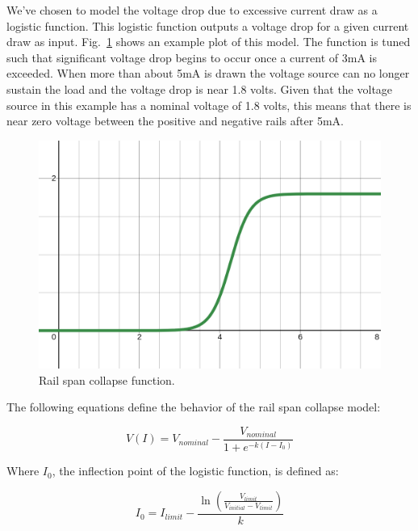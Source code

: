 \documentclass[conference]{IEEEtran}
\begin{document}
    We've chosen to model the voltage drop due to excessive current draw as a logistic function.
    This logistic function outputs a voltage drop for a given current draw as input.
    Fig.~\ref{fig:rail_collapse_function} shows an example plot of this model.
    The function is tuned such that significant voltage drop begins to occur once a current of 3mA is exceeded.
    When more than about 5mA is drawn the voltage source can no longer sustain the load and the voltage drop is near 1.8 volts.
    Given that the voltage source in this example has a nominal voltage of 1.8 volts, this means that there is near zero voltage between the positive and negative rails after 5mA\@.

    \begin{figure}[htbp]
        \centering
        \includegraphics[width=0.95\linewidth]{rail_collapse_function}
        \caption{Rail span collapse function.}
        \label{fig:rail_collapse_function}
    \end{figure}

    The following equations define the behavior of the rail span collapse model:

    \begin{equation}
        V(I) = V_{nominal} - \frac{V_{nominal}}{1 + e^{-k(I - I_0)}}
        \label{eq:VI}
    \end{equation}

    Where \(I_0\), the inflection point of the logistic function, is defined as:

    \begin{equation}
        I_0 = I_{limit} - \frac{\ln\left(\frac{V_{limit}}{V_{initial} - V_{limit}}\right)}{k}
        \label{eq:I0}
    \end{equation}
\end{document}
